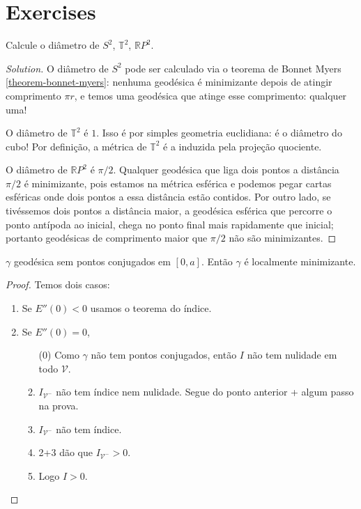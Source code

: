 \section{Exercises}
\label{section-exercises}

\begin{exercise}
Calcule o diâmetro de $S^2$, $\mathbb{T}^2$, $\mathbb{R}P^{2}$.
\end{exercise}

\begin{proof}[Solution]
O diâmetro de $S^2$ pode ser calculado via o teorema de Bonnet Myers
\ref{theorem-bonnet-myers}: nenhuma geodésica é minimizante depois de atingir
comprimento $\pi r$, e temos uma geodésica que atinge esse comprimento: qualquer
uma!

O diâmetro de $\mathbb{T}^2$ é $1$. Isso é por simples geometria
euclidiana: é o diâmetro do cubo! Por definição, a métrica de  $\mathbb{T}^2$ é
a induzida pela projeção quociente.

O diâmetro de $\mathbb{R}P^{2}$ é $\pi/2$. Qualquer geodésica que liga dois
pontos a distância $\pi/2$ é minimizante, pois estamos na métrica esférica e
podemos pegar cartas esféricas onde dois pontos a essa distância estão contidos. 
Por outro lado, se tivéssemos dois pontos a distância maior, a geodésica 
esférica que percorre o ponto antípoda ao inicial, chega no ponto final mais 
rapidamente que inicial; portanto geodésicas de comprimento maior que $\pi/2$ 
não são minimizantes.
\end{proof}

\begin{exercise}
\label{exercise-pts}
$\gamma$ geodésica sem pontos conjugados em $[0,a]$. Então $\gamma$ é localmente
minimizante.
\end{exercise}

\begin{proof}
Temos dois casos:
\begin{enumerate}
\item Se $E''(0)<0$ usamos o teorema do índice.
\item Se $E''(0)=0$,
\begin{enumerate}
\item[(0)] Como $\gamma$ não tem pontos conjugados, então $I$ não tem
		nulidade em todo  $\mathcal{V}$.
\item $I_{\mathcal{V}^-}$ não tem índice nem nulidade. Segue do ponto anterior +
	algum passo na prova.
\item $I_{\mathcal{V}^-}$ não tem índice.
\item 2+3 dão que $I_{\mathcal{V}^-}>0$.
\item Logo $I>0$.
\end{enumerate}
\end{enumerate}
\end{proof}

